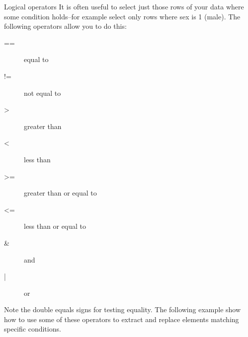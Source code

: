 \documentclass[table,smaller]{beamer}
\begin{document}
\begin{frame}[label=sec-5-3]{Logical operators}
It is often useful to select just those rows of your data where some condition holds--for example select only rows where sex is 1 (male). The following operators allow you to do this:

\begin{description}
\item[{==}] equal to
\item[{!=}] not equal to
\item[{>}] greater than
\item[{<}] less than
\item[{>=}] greater than or equal to
\item[{<=}] less than or equal to
\item[{\&}] and
\item[{|}] or
\end{description}

Note the double equals signs for testing equality. The following example show how to use some of these operators to extract and replace elements matching specific conditions.
\end{frame}
\end{document}
